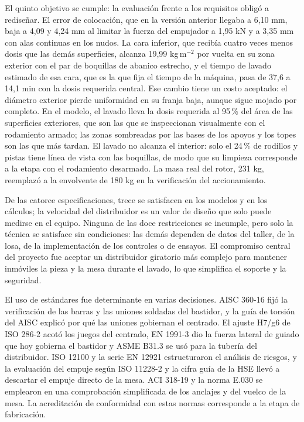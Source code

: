 El quinto objetivo se cumple: la evaluación frente a los requisitos obligó a rediseñar. El error de colocación, que en la versión anterior llegaba a 6,10 mm, baja a 4,09 y 4,24 mm al limitar la fuerza del empujador a 1,95 kN y a 3,35 mm con alas continuas en los nudos. La cara inferior, que recibía cuatro veces menos dosis que las demás superficies, alcanza 19,99 kg\,m$^{-2}$ por vuelta en su zona exterior con el par de boquillas de abanico estrecho, y el tiempo de lavado estimado de esa cara, que es la que fija el tiempo de la máquina, pasa de 37,6 a 14,1 min con la dosis requerida central. Ese cambio tiene un costo aceptado: el diámetro exterior pierde uniformidad en su franja baja, aunque sigue mojado por completo. En el modelo, el lavado lleva la dosis requerida al 95\,\% del área de las superficies exteriores, que son las que se inspeccionan visualmente con el rodamiento armado; las zonas sombreadas por las bases de los apoyos y los topes son las que más tardan. El lavado no alcanza el interior: solo el 24\,\% de rodillos y pistas tiene línea de vista con las boquillas, de modo que su limpieza corresponde a la etapa con el rodamiento desarmado. La masa real del rotor, 231 kg, reemplazó a la envolvente de 180 kg en la verificación del accionamiento.

De las catorce especificaciones, trece se satisfacen en los modelos y en los cálculos; la velocidad del distribuidor es un valor de diseño que solo puede medirse en el equipo. Ninguna de las doce restricciones se incumple, pero solo la técnica se satisface sin condiciones: las demás dependen de datos del taller, de la losa, de la implementación de los controles o de ensayos. El compromiso central del proyecto fue aceptar un distribuidor giratorio más complejo para mantener inmóviles la pieza y la mesa durante el lavado, lo que simplifica el soporte y la seguridad.

El uso de estándares fue determinante en varias decisiones. AISC 360-16 fijó la verificación de las barras y las uniones soldadas del bastidor, y la guía de torsión del AISC explicó por qué las uniones gobiernan el centrado. El ajuste H7/g6 de ISO 286-2 acotó los juegos del centrado, EN 1991-3 dio la fuerza lateral de guiado que hoy gobierna el bastidor y ASME B31.3 se usó para la tubería del distribuidor. ISO 12100 y la serie EN 12921 estructuraron el análisis de riesgos, y la evaluación del empuje según ISO 11228-2 y la cifra guía de la HSE llevó a descartar el empuje directo de la mesa. ACI 318-19 y la norma E.030 se emplearon en una comprobación simplificada de los anclajes y del vuelco de la mesa. La acreditación de conformidad con estas normas corresponde a la etapa de fabricación.

